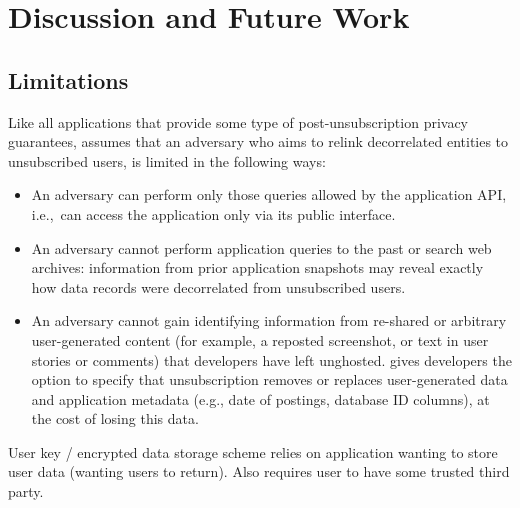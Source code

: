 \section{Discussion and Future Work}

\iffalse
\subsection{Limitations}

Like all applications that provide some type of post-unsubscription privacy guarantees, \sys assumes
that an adversary who aims to relink decorrelated entities to unsubscribed users, is limited in the
following ways:
\begin{itemize}
    \item An adversary can perform only those queries allowed by the application API,
i.e.,\ can access the application only via its public interface.

    \item An adversary cannot perform application queries to the past or search web archives:
    information from prior application snapshots may reveal
    exactly how data records were decorrelated from unsubscribed users.

    \item An adversary cannot gain identifying information from re-shared or arbitrary
        user-generated content (for example, a reposted screenshot, or text in user stories or
        comments) that developers have left unghosted. 
        \sys gives developers the option to specify that unsubscription removes or replaces
        user-generated data and application metadata (e.g., date of postings, database ID columns),
        at the cost of losing this data.
\end{itemize}

User key / encrypted data storage scheme relies on application wanting to store user data (wanting
users to return). Also requires user to have some trusted third party.


